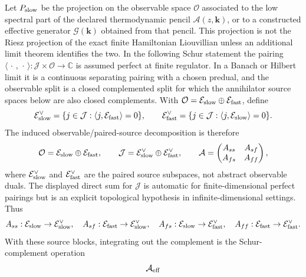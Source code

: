 \begin{controlledapproximation}
\label{ca:hydro-slow-sector-completeness}
Let \(P_{\rm slow}\) be the projection on the observable space
\(\mathcal O\) associated to the low spectral part of the declared
thermodynamic pencil \(\mathcal A(z,\mathbf k)\), or to a constructed
effective generator \(\mathcal G(\mathbf k)\) obtained from that pencil.  This
projection is not the Riesz projection of the exact finite Hamiltonian
Liouvillian unless an additional limit theorem identifies the two.  In the
following Schur statement the pairing
\(\langle\,\cdot\,,\,\cdot\,\rangle:\mathcal J\times\mathcal O\to\mathbb C\)
is assumed perfect at finite regulator.  In a Banach or Hilbert limit it is a
continuous separating pairing with a chosen predual, and the observable split
is a closed complemented split for which the annihilator source spaces below
are also closed complements.  With
\(\mathcal O=\mathcal E_{\rm slow}\oplus\mathcal E_{\rm fast}\), define
\begin{equation}
  \mathcal E_{\rm slow}^{\vee}
  =
  \{j\in\mathcal J:\langle j,\mathcal E_{\rm fast}\rangle=0\},
  \qquad
  \mathcal E_{\rm fast}^{\vee}
  =
  \{j\in\mathcal J:\langle j,\mathcal E_{\rm slow}\rangle=0\}.
  \label{eq:hydro-source-annihilators}
\end{equation}
The induced observable/paired-source decomposition is therefore
\[
  \mathcal O
  =
  \mathcal E_{\rm slow}\oplus \mathcal E_{\rm fast},
  \qquad
  \mathcal J
  =
  \mathcal E_{\rm slow}^\vee\oplus\mathcal E_{\rm fast}^\vee,
  \qquad
  \mathcal A
  =
  \begin{pmatrix}
    A_{ss} & A_{sf}\\
    A_{fs} & A_{ff}
  \end{pmatrix},
\]
where \(\mathcal E_{\rm slow}^\vee\) and
\(\mathcal E_{\rm fast}^\vee\) are the paired source subspaces, not abstract
observable duals.  The displayed direct sum for \(\mathcal J\) is automatic
for finite-dimensional perfect pairings but is an explicit topological
hypothesis in infinite-dimensional settings.  Thus
\[
  A_{ss}:\mathcal E_{\rm slow}\to\mathcal E_{\rm slow}^\vee,\quad
  A_{sf}:\mathcal E_{\rm fast}\to\mathcal E_{\rm slow}^\vee,\quad
  A_{fs}:\mathcal E_{\rm slow}\to\mathcal E_{\rm fast}^\vee,\quad
  A_{ff}:\mathcal E_{\rm fast}\to\mathcal E_{\rm fast}^\vee .
\]
With these source blocks, integrating out the complement is the
Schur-complement operation
\begin{equation}
  \mathcal A_{\rm eff}

\end{equation}
\end{controlledapproximation}
